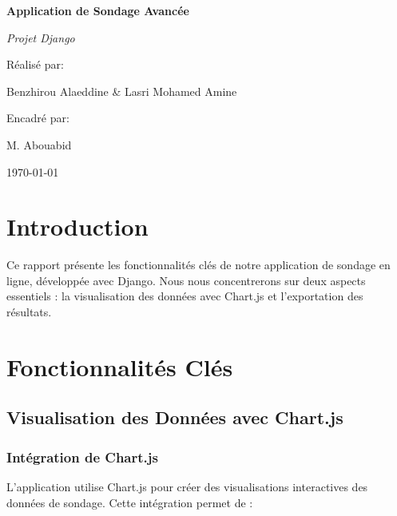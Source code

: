 \documentclass[a4paper,12pt]{report}
\begin{document}
\begin{titlepage}
    \centering
    {\huge\bfseries Application de Sondage Avancée\par}
    \vspace{2cm}
    {\Large\itshape Projet Django\par}
    \vspace{1.5cm}
    {\large Réalisé par:\par}
    {\large Benzhirou Alaeddine \& Lasri Mohamed Amine\par}
    \vspace{1cm}
    {\large Encadré par:\par}
    {\large M. Abouabid\par}
    \vfill
    {\large \today\par}
\end{titlepage}

\tableofcontents
\newpage

\chapter{Introduction}
Ce rapport présente les fonctionnalités clés de notre application de sondage en ligne, développée avec Django. Nous nous concentrerons sur deux aspects essentiels : la visualisation des données avec Chart.js et l'exportation des résultats.

\chapter{Fonctionnalités Clés}

\section{Visualisation des Données avec Chart.js}

\subsection{Intégration de Chart.js}
L'application utilise Chart.js pour créer des visualisations interactives des données de sondage. Cette intégration permet de :
\end{document}
